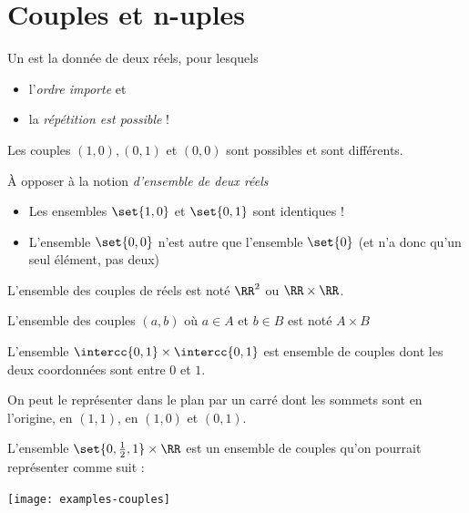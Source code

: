 \section{Couples et n-uples}
\begin{frame}
Un  est la donnée de deux réels, pour lesquels\pause
\begin{itemize}[<+->]
\item l'\emph{ordre importe} et
\item la \emph{répétition est possible} !
\end{itemize}\pause
\begin{example}
  Les couples \((1,0), (0,1)\) et \((0,0)\) sont possibles et sont différents.
\end{example}\pause{}

À opposer à la notion \emph{d'ensemble de deux réels}\pause
\begin{example}
  \begin{itemize}[<+->]
  \item Les ensembles \(\set{1,0}\) et \(\set{0,1}\) sont identiques !
  \item L'ensemble \(\set{0, 0}\) n'est autre que l'ensemble \(\set{0}\) (et n'a donc qu'un seul élément, pas deux)
  \end{itemize}
\end{example}
\end{frame}

\begin{frame}
  \begin{definition}
    L'ensemble des couples de réels est noté \(\RR^2\) ou \(\RR \times \RR\).\pause

    L'ensemble des couples \((a,b)\) où \(a \in A\) et \(b\in B\) est noté \(A\times B\)
  \end{definition}

  \begin{example}
    L'ensemble \(\intercc{0,1}\times\intercc{0,1}\) est ensemble de couples dont les deux coordonnées sont entre \(0\) et \(1\).\pause

    On peut le représenter dans le plan par un carré dont les sommets sont en l'origine, en \((1,1)\), en \((1,0)\) et \((0,1)\).
  \end{example}
\end{frame}
\begin{frame}
\begin{example}
    L'ensemble \(\set{ 0, \frac{1}{2}, 1} \times \RR\) est un ensemble de couples qu'on pourrait représenter comme suit :
    \begin{center}
      \texttt{[image: examples-couples]}
    \end{center}
  \end{example}
\end{frame}

